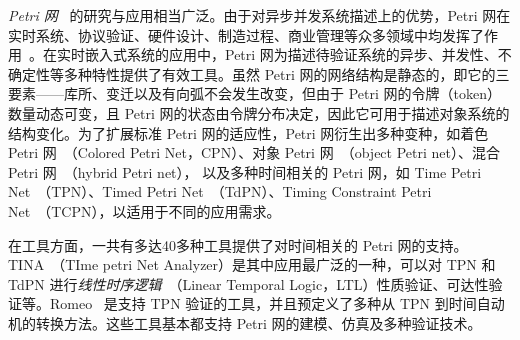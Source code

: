 \emph{Petri 网}~\cite{murata1989} 的研究与应用相当广泛。由于对异步并发系统描述上的优势，Petri 网在实时系统、协议验证、硬件设计、制造过程、商业管理等众多领域中均发挥了作用~\cite{DBLP:journals/isci/KheldounBI17,DBLP:journals/jwe/XuPW17,DBLP:journals/tmc/ZhangAYM16,DBLP:conf/ACISicis/SalahBK15}。在实时嵌入式系统的应用中，Petri 网为描述待验证系统的异步、并发性、不确定性等多种特性提供了有效工具。虽然 Petri 网的网络结构是静态的，即它的三要素——库所、变迁以及有向弧不会发生改变，但由于 Petri 网的令牌（token）数量动态可变，且 Petri 网的状态由令牌分布决定，因此它可用于描述对象系统的结构变化。为了扩展标准 Petri 网的适应性，Petri 网衍生出多种变种，如着色 Petri 网~\cite{DBLP:series/eatcs/Jensen97}（Colored Petri Net，CPN）、对象 Petri 网~\cite{DBLP:conf/apn/Lakos95}（object Petri net）、混合 Petri 网~\cite{david2010discrete}（hybrid Petri net），
以及多种时间相关的 Petri 网，如 Time Petri Net~\cite{DBLP:journals/tse/BerthomieuD91}（TPN）、Timed Petri Net~\cite{DBLP:conf/isca/Zuberek80}（TdPN）、Timing Constraint Petri Net~\cite{DBLP:journals/tse/TsaiYC95}（TCPN），以适用于不同的应用需求。


在工具方面，一共有多达40多种工具提供了对时间相关的 Petri 网的支持。TINA~\cite{DBLP:conf/qest/BerthomieuV06}（TIme petri Net Analyzer）是其中应用最广泛的一种，可以对 TPN 和 TdPN 进行\emph{线性时序逻辑}~\cite{DBLP:conf/banff/Vardi95}（Linear Temporal Logic，LTL）性质验证、可达性验证等。Romeo~\cite{DBLP:conf/cav/GardeyLMR05} 是支持 TPN 验证的工具，并且预定义了多种从 TPN 到时间自动机的转换方法。这些工具基本都支持 Petri 网的建模、仿真及多种验证技术。


